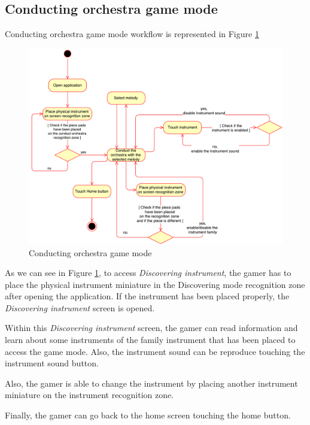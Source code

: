 \newpage
\subsection{Conducting orchestra game mode}
\label{subsec:conducteorchestra_arch}

Conducting orchestra game mode workflow is represented in Figure \ref{fig:conductingworkflow}

\begin{figure}[ht!]
	\centering
	\includegraphics[width=400pt]{graphics/ConductingGameMode.pdf}
	\caption{Conducting orchestra game mode}
	\label{fig:conductingworkflow}
\end{figure}

As we can see in Figure \ref{fig:conductingworkflow}, to access \textit{Discovering instrument}, the gamer has to place the physical instrument miniature in the Discovering mode recognition zone after opening the application. If the instrument has been placed properly, the \textit{Discovering instrument} screen is opened.

Within this \textit{Discovering instrument} screen, the gamer can read information and learn about some instruments of the family instrument that has been placed to access the game mode. Also, the instrument sound can be reproduce touching the instrument sound button.

Also, the gamer is able to change the instrument by placing another instrument miniature on the instrument recognition zone.

Finally, the gamer can go back to the home screen touching the home button.

